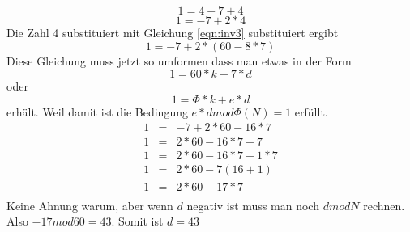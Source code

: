 \begin{equation}
1 = 4 - 7+4
\end{equation}
\begin{equation}
1 = -7 + 2*4
\end{equation}
Die Zahl 4 substituiert mit Gleichung \ref{eqn:inv3} substituiert ergibt
\begin{equation}
1 = -7 + 2*(60-8*7)
\end{equation}
Diese Gleichung muss jetzt so umformen dass man etwas in der Form
\begin{equation*}
1 = 60*k + 7*d
\end{equation*}
oder
\begin{equation*}
1 = \Phi*k + e*d
\end{equation*}
erhält. Weil damit ist die Bedingung $e*d mod \Phi(N) = 1$ erfüllt.
\begin{eqnarray*}
1 & = & -7 + 2*60-16*7 \\
1 & = & 2 * 60-16*7-7 \\
1 & = & 2 * 60-16*7-1*7\\
1 & = & 2 * 60-7(16+1)\\
1 & = & 2 * 60-17*7 \\
\end{eqnarray*}
Keine Ahnung warum, aber wenn $d$ negativ ist muss man noch $d mod N$ rechnen. Also $-17 mod 60 = 43$. Somit ist $d = 43$
